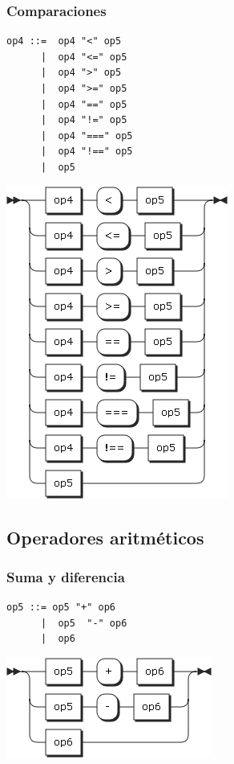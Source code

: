 \subsubsection{Comparaciones}
\begin{multicols}{2}
\begin{lstlisting}[style=nonumbers]      
op4 ::=  op4 "<" op5
      |  op4 "<=" op5
      |  op4 ">" op5
      |  op4 ">=" op5
      |  op4 "==" op5
      |  op4 "!=" op5
      |  op4 "===" op5
      |  op4 "!==" op5
      |  op5
\end{lstlisting}  
\columnbreak	
\begin{center}
\includegraphics[scale=0.5]{diagram/op4.png} \\
\end{center}
\end{multicols}

\subsection{Operadores aritméticos}
\subsubsection{Suma y diferencia}
\begin{multicols}{2}
\begin{lstlisting}[style=nonumbers]      
op5 ::= op5 "+" op6
      |  op5  "-" op6
      |  op6
\end{lstlisting}  
\columnbreak	
\begin{center}
\includegraphics[scale=0.5]{diagram/op5.png} \\
\end{center}
\end{multicols}

